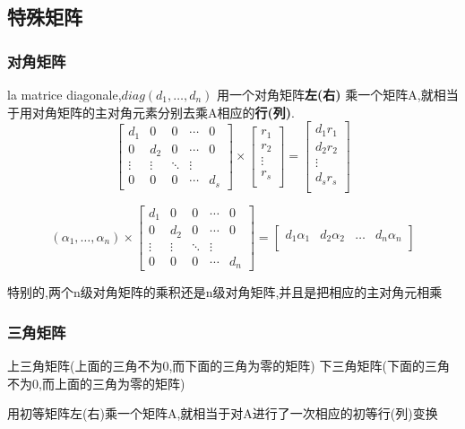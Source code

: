 \documentclass{article}
\begin{document}
\subsection{特殊矩阵}
\subsubsection{对角矩阵}
la matrice diagonale,$diag(d_1,\ldots,d_n)$ \newline
用一个对角矩阵{\bf 左(右) }乘一个矩阵A,就相当于用对角矩阵的主对角元素分别去乘A相应的{\bf 行(列)}.
$$
\begin{bmatrix}
  d_1 & 0  & 0 & \cdots & 0 \\
  0   & d_2 & 0 & \cdots & 0 \\
  \vdots & \vdots & \ddots & \vdots \\
  0 & 0 & 0 & \cdots & d_s
\end{bmatrix}
\times
\begin{bmatrix}
  r_1  \\
  r_2 \\
  \vdots \\
  r_s \\
\end{bmatrix}
=
\begin{bmatrix}
  d_1 r_1  \\
  d_2 r_2 \\
  \vdots \\
  d_s r_s \\
\end{bmatrix}
$$

$$
(\alpha_1,\ldots,\alpha_n)
\times
\begin{bmatrix}
  d_1 & 0  & 0 & \cdots & 0 \\
  0   & d_2 & 0 & \cdots & 0 \\
  \vdots & \vdots & \ddots & \vdots \\
  0 & 0 & 0 & \cdots & d_n
\end{bmatrix}
=
\begin{bmatrix}
  d_1 \alpha_1 & d_2 \alpha_2 & \dots & d_n \alpha_n \\
\end{bmatrix}
$$

特别的,两个n级对角矩阵的乘积还是n级对角矩阵,并且是把相应的主对角元相乘

\subsubsection{三角矩阵}
上三角矩阵(上面的三角不为0,而下面的三角为零的矩阵) \newline
下三角矩阵(下面的三角不为0,而上面的三角为零的矩阵)
\begin{note}
  用初等矩阵左(右)乘一个矩阵A,就相当于对A进行了一次相应的初等行(列)变换
\end{note}
\end{document}
